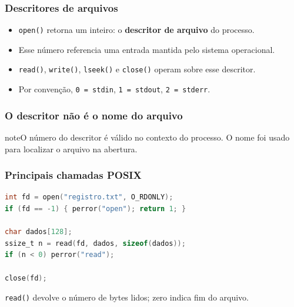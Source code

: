 \documentclass[aspectratio=169,11pt]{beamer}
\begin{document}
\begin{frame}
\frametitle{Descritores de arquivos}
\large
\begin{itemize}
\item \texttt{open()} retorna um inteiro: o \textbf{descritor de arquivo} do processo.
\item Esse número referencia uma entrada mantida pelo sistema operacional.
\item \texttt{read()}, \texttt{write()}, \texttt{lseek()} e \texttt{close()} operam sobre esse descritor.
\item Por convenção, \texttt{0 = stdin}, \texttt{1 = stdout}, \texttt{2 = stderr}.
\end{itemize}

\end{frame}

\begin{frame}
\frametitle{O descritor não é o nome do arquivo}
\begin{center}\end{center}
\vfill\begin{beamercolorbox}[wd=\textwidth,sep=2mm,rounded=true]{note}\small O número do descritor é válido no contexto do processo. O nome foi usado para localizar o arquivo na abertura.\end{beamercolorbox}
\end{frame}

\begin{frame}[fragile]
\frametitle{Principais chamadas POSIX}
\begin{lstlisting}[language=C]
int fd = open("registro.txt", O_RDONLY);
if (fd == -1) { perror("open"); return 1; }

char dados[128];
ssize_t n = read(fd, dados, sizeof(dados));
if (n < 0) perror("read");

close(fd);
\end{lstlisting}
\vfill\small\textcolor{dkblue}{\texttt{read()} devolve o número de bytes lidos; zero indica fim do arquivo.}

\end{frame}
\end{document}
